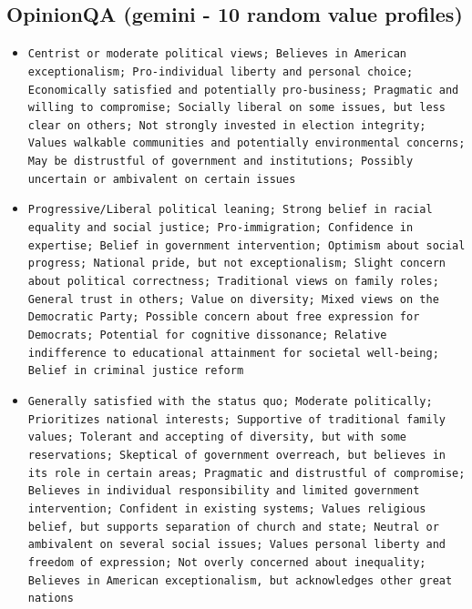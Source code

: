 \documentclass[11pt]{article}
\begin{document}
\subsection{OpinionQA (gemini - 10 random value profiles)}
\begin{itemize}
\item \texttt{Centrist or moderate political views; Believes in American exceptionalism; Pro-individual liberty and personal choice; Economically satisfied and potentially pro-business; Pragmatic and willing to compromise; Socially liberal on some issues, but less clear on others; Not strongly invested in election integrity; Values walkable communities and potentially environmental concerns; May be distrustful of government and institutions; Possibly uncertain or ambivalent on certain issues}
\item \texttt{Progressive/Liberal political leaning; Strong belief in racial equality and social justice; Pro-immigration; Confidence in expertise; Belief in government intervention; Optimism about social progress; National pride, but not exceptionalism; Slight concern about political correctness; Traditional views on family roles; General trust in others; Value on diversity; Mixed views on the Democratic Party; Possible concern about free expression for Democrats; Potential for cognitive dissonance; Relative indifference to educational attainment for societal well-being; Belief in criminal justice reform}
\item \texttt{Generally satisfied with the status quo; Moderate politically; Prioritizes national interests; Supportive of traditional family values; Tolerant and accepting of diversity, but with some reservations; Skeptical of government overreach, but believes in its role in certain areas; Pragmatic and distrustful of compromise; Believes in individual responsibility and limited government intervention; Confident in existing systems; Values religious belief, but supports separation of church and state; Neutral or ambivalent on several social issues; Values personal liberty and freedom of expression; Not overly concerned about inequality; Believes in American exceptionalism, but acknowledges other great nations}

\end{itemize}
\end{document}
